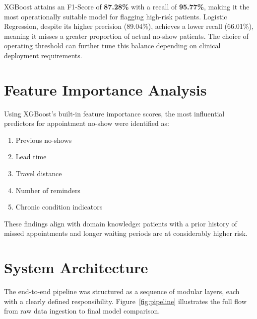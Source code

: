 \documentclass[12pt, a4paper]{report}
\begin{document}
\noindent XGBoost attains an F1-Score of \textbf{87.28\%} with a recall of
\textbf{95.77\%}, making it the most operationally suitable model for flagging
high-risk patients. Logistic Regression, despite its higher precision
(89.04\%), achieves a lower recall (66.01\%), meaning it misses a greater
proportion of actual no-show patients. The choice of operating threshold can
further tune this balance depending on clinical deployment requirements.

\chapter{Feature Importance Analysis}

Using XGBoost's built-in feature importance scores, the most influential
predictors for appointment no-show were identified as:

\begin{enumerate}
  \item Previous no-shows
  \item Lead time
  \item Travel distance
  \item Number of reminders
  \item Chronic condition indicators
\end{enumerate}

These findings align with domain knowledge: patients with a prior history of
missed appointments and longer waiting periods are at considerably higher risk.

\chapter{System Architecture}

The end-to-end pipeline was structured as a sequence of modular layers,
each with a clearly defined responsibility. Figure~\ref{fig:pipeline}
illustrates the full flow from raw data ingestion to final model comparison.

\vspace{0.6cm}
\end{document}
